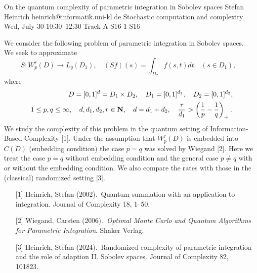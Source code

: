 \begin{talk}
  {On the quantum complexity of parametric integration in Sobolev spaces}%
  {Stefan Heinrich}%
  {heinrich@informatik.uni-kl.de}%
  {Stochastic computation and complexity}%
  {}%
  {}%
  {Wed, July 30 10:30–12:30 Track A}%
  {S16-1}%
  {S16}%
				
			
We consider the following problem of parametric integration in Sobolev spaces. We seek to approximate
$$
S:W_p^r(D)\to L_q(D_1), \quad (Sf)(s)=\int_{D_2}f(s,t)dt \quad (s\in D_1),
$$ 
where 
%
\begin{eqnarray*}
&&D=[0,1]^d=D_1\times D_2,\quad D_1=[0,1]^{d_1}, \quad D_2=[0,1]^{d_2}, 
\\
&&1\le p,q\le \infty, \quad d,d_1,d_2,r\in {\bf N},\quad d=d_1+d_2,\quad \frac{r}{d_1}>\left(\frac{1}{p}-\frac{1}{q}\right)_+\, .
\end{eqnarray*}
%
We study the complexity of this problem in the quantum setting of Information-Based Complexity [1]. Under the assumption that $W_p^r(D)$ is embedded into $C(D)$ (embedding condition) the case $p=q$ was solved by Wiegand [2]. Here we treat the case $p=q$ without embedding condition and the general case $p\ne q$ with or without the embedding condition. We also compare the rates with those in the (classical) randomized setting [3].


\medskip

\begin{enumerate}

\item[{[1]}] Heinrich, Stefan (2002).\  Quantum summation with an application to integration. 
Journal of Complexity 18, 1--50.
\item[{[2]}] Wiegand, Carsten (2006).\ {\it Optimal Monte Carlo and Quantum Algorithms for Parametric Integration}. Shaker Verlag.
\item[{[3]}] Heinrich, Stefan (2024).\  Randomized complexity of parametric integration and
the role of adaption  II. Sobolev spaces. Journal of Complexity 82, 101823.
\end{enumerate}

\end{talk}

